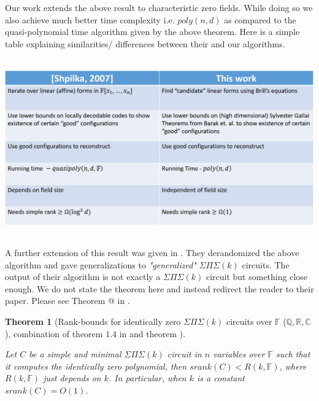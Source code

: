 \documentclass[12pt]{caltech_thesis}
\makeatletter
\theoremstyle{plain}
\newtheorem{theorem}{Theorem}
\theoremstyle{definition}
\newcommand{\F}{\mathbb{F}}
\newcommand{\C}{\mathbb{C}}
\newcommand{\Q}{\mathbb{Q}}
\newcommand{\R}{\mathbb{R}}
\newcommand*{\rom}[1]{\expandafter\@slowromancap\romannumeral #1@}
\makeatother
\begin{document}
Our work extends the above result to characteristic zero fields. While doing so we also achieve much better time complexity i.e.
$poly(n,d)$ as compared to the quasi-polynomial time algorithm given by the above theorem. Here is a simple table explaining 
similarities/ differences between their and our algorithms.


 \includegraphics[width = 6in, height=3in]{comparison.jpg}




A further extension of this result was given in \cite{KarShp09}. They derandomized the above algorithm and gave 
generalizations to \emph{"generalized"} $\Sigma\Pi\Sigma(k)$ circuits. The output of their algorithm is not exactly a $\Sigma\Pi\Sigma(k)$ circuit
but something close enough. We do not state the theorem here and instead redirect the reader to their 
paper. Please see Theorem \rom{1} in \cite{KarShp09}.


\begin{theorem}[Rank-bounds for identically zero $\Sigma\Pi\Sigma(k)$ circuits over $\F$ ($\Q,\R,\C$), 
combination of theorem $1.4$ in \cite{SS10} and 
theorem \cite{DSW12}]\label{theorem:rankboundtheorem}

Let $C$ be a simple and minimal $\Sigma\Pi\Sigma(k)$ circuit in $n$ variables over $\F$ such that it computes the identically zero
polynomial, then $srank(C) < R(k,\F)$, where $R(k,\F)$ just depends on $k$. In particular, when $k$ is a constant $srank(C) = O(1)$.

\end{theorem}
\end{document}
